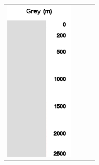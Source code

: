\begin{maxipage}
\begin{longtable}{c c c c}
\includegraphics[angle=0,width=3.5cm,keepaspectratio='true']{figures/ramp-terrain-grey.png}
\\


\end{longtable}
\end{maxipage}
